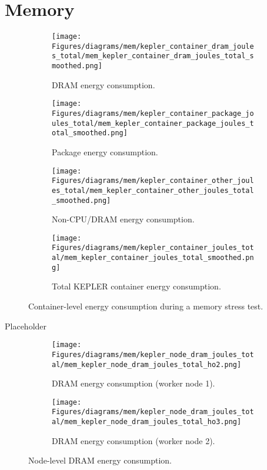 

\section{Memory}

\begin{figure}[H]
    \centering
    \begin{subfigure}{0.49\textwidth}
        \texttt{[image: Figures/diagrams/mem/kepler\_container\_dram\_joules\_total/mem\_kepler\_container\_dram\_joules\_total\_smoothed.png]}
        \caption{DRAM energy consumption.}
    \end{subfigure}
    \begin{subfigure}{0.49\textwidth}
        \texttt{[image: Figures/diagrams/mem/kepler\_container\_package\_joules\_total/mem\_kepler\_container\_package\_joules\_total\_smoothed.png]}
        \caption{Package energy consumption.}
    \end{subfigure}
    \begin{subfigure}{0.49\textwidth}
        \texttt{[image: Figures/diagrams/mem/kepler\_container\_other\_joules\_total/mem\_kepler\_container\_other\_joules\_total\_smoothed.png]}
        \caption{Non-CPU/DRAM energy consumption.}
    \end{subfigure}
    \begin{subfigure}{0.49\textwidth}
        \texttt{[image: Figures/diagrams/mem/kepler\_container\_joules\_total/mem\_kepler\_container\_joules\_total\_smoothed.png]}
        \caption{Total KEPLER container energy consumption.}
    \end{subfigure}
    \caption{Container-level energy consumption during a memory stress test.}
\end{figure}

Placeholder

\begin{figure}[H]
    \centering
    \begin{subfigure}{0.49\textwidth}
        \texttt{[image: Figures/diagrams/mem/kepler\_node\_dram\_joules\_total/mem\_kepler\_node\_dram\_joules\_total\_ho2.png]}
        \caption{DRAM energy consumption (worker node 1).}
    \end{subfigure}
    \begin{subfigure}{0.49\textwidth}
        \texttt{[image: Figures/diagrams/mem/kepler\_node\_dram\_joules\_total/mem\_kepler\_node\_dram\_joules\_total\_ho3.png]}
        \caption{DRAM energy consumption (worker node 2).}
    \end{subfigure}
    \caption{Node-level DRAM energy consumption.}
\end{figure}

